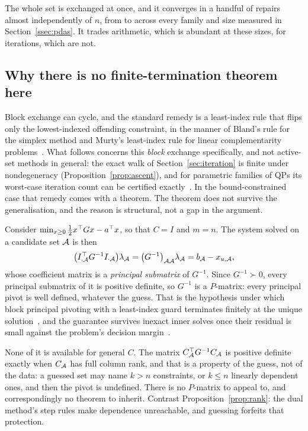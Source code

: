 The whole set is exchanged at once, and it converges in a handful of
repairs almost independently of $n$, from \qpPdasRepairsLo{} to
\qpPdasRepairsHi{} across every family and size measured in
Section~\ref{ssec:pdas}. It trades arithmetic, which is abundant at these sizes,
for iterations, which are not.

\subsection{Why there is no finite-termination theorem here}

Block exchange can cycle, and the standard remedy is a least-index rule that flips
only the lowest-indexed offending constraint, in the manner of Bland's rule for
the simplex method and Murty's least-index rule for linear complementarity
problems~\cite{murty1988}. What follows concerns this \emph{block} exchange
specifically, and not active-set methods in general: the exact walk of
Section~\ref{sec:iteration} is finite under nondegeneracy
(Proposition~\ref{prop:ascent}), and for parametric families of QPs its worst-case
iteration count can be certified exactly~\cite{arnstrom2022certification}. In the bound-constrained case that remedy comes with a
theorem. The theorem does not survive the generalisation, and the reason is
structural, not a gap in the argument.

Consider $\min_{x \ge 0} \tfrac12 x^{\top} G x - a^{\top} x$, so that $C = I$ and $m = n$.
The system solved on a candidate set $\mathcal{A}$ is then
\begin{equation}
  \bigl(I_{\cdot\mathcal{A}}^{\top} G^{-1} I_{\cdot\mathcal{A}}\bigr)\lambda_{\mathcal{A}}
  = \bigl(G^{-1}\bigr)_{\mathcal{A}\mathcal{A}}\lambda_{\mathcal{A}}
  = b_{\mathcal{A}} - x_{u,\mathcal{A}},
  \label{eq:principal}
\end{equation}
whose coefficient matrix is a \emph{principal submatrix} of $G^{-1}$. Since
$G^{-1} \succ 0$, every principal submatrix of it is positive definite, so
$G^{-1}$ is a $P$-matrix: every principal pivot is well defined, whatever the
guess. That is the hypothesis under which block principal pivoting with a
least-index guard terminates finitely at the unique
solution~\cite{judice1994,murty1988}, and the guarantee survives inexact inner
solves once their residual is small against the problem's decision
margin~\cite{schmelzer2026nncg}.

None of it is available for general $C$. The matrix
$C_{\mathcal{A}}^{\top} G^{-1} C_{\mathcal{A}}$ is positive definite exactly when $C_{\mathcal{A}}$ has
full column rank, and that is a property of the guess, not of the data: a guessed
set may name $k > n$ constraints, or $k \le n$ linearly dependent ones, and then
the pivot is undefined. There is no $P$-matrix to
appeal to, and correspondingly no theorem to inherit. Contrast
Proposition~\ref{prop:rank}: the dual method's step rules make dependence
unreachable, and guessing forfeits that protection.


